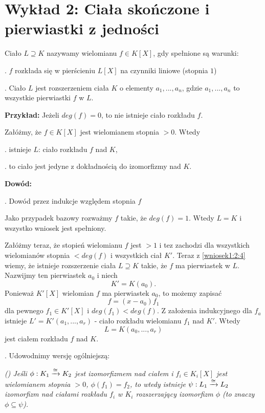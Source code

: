 \section{Wykład 2: Ciała skończone i pierwiastki z jedności}

\begin{important}
Ciało $L\supseteq K$ nazywamy  wielomianu $f\in K[X]$, gdy spełnione są warunki:

. $f$ rozkłada się w pierścieniu $L[X]$ na czynniki liniowe (stopnia $1$)

. Ciało $L$ jest rozszerzeniem ciała $K$ o elementy $a_1,...,a_n$, gdzie $a_1,...,a_n$ to wszystkie pierwiastki $f$ w $L$.
\end{important}

\textbf{Przykład:} Jeżeli $deg(f)=0$, to nie istnieje ciało rozkładu $f$.

\begin{wniosek}
    \label{wniosek:2.1}
    Załóżmy, że $f\in K[X]$ jest wielomianem stopnia $>0$. Wtedy

. istnieje $L$: ciało rozkładu $f$ nad $K$,

. to ciało jest jedyne z dokładnością do izomorfizmy nad $K$.
\end{wniosek}

\textbf{Dowód:}

. Dowód przez indukcje względem stopnia $f$

Jako przypadek bazowy rozważmy $f$ takie, że $deg(f)=1$. Wtedy $L=K$ i wszystko wniosek jest spełniony.

Załóżmy teraz, że stopień wielomianu $f$ jest $>1$ i tez zachodzi dla wszystkich wielomianów stopnia $<deg(f)$ i wszystkich ciał $K'$. Teraz z \ref{wniosek1:2:4} wiemy, że istnieje rozszerzenie ciała $L\supseteq K$ takie, że $f$ ma pierwiastek w $L$. Nazwijmy ten pierwiastek $a_0$ i niech
$$K'=K(a_0).$$
Ponieważ $K'[X]$ wielomian $f$ ma pierwiastek $a_0$, to możemy zapisać
$$f=(x-a_0)f_1$$
dla pewnego $f_1\in K'[X]$ i $deg(f_1)<deg(f)$. Z założenia indukcyjnego dla $f_a$ istnieje $L'=K'(a_1,...,a_r)$ - ciało rozkładu wielomianu $f_1$ nad $K'$. Wtedy 
$$L=K(a_0,...,a_r)$$
jest ciałem rozkładu $f$ nad $K$.

. Udowodnimy wersję ogólniejszą: 
\label{stwierdzenie:wniosek}

\emph{(\bat) Jeśli $\phi:K_1\xrightarrow[]{\cong} K_2$ jest izomorfizmem nad ciałem i $f_i\in K_i[X]$ jest wielomianem stopnia $>0$, $\phi(f_1)=f_2$, to wtedy istnieje $ \psi:L_1\xrightarrow[]{\cong} L_2$ izomorfizm nad ciałami rozkładu $f_i$ w $K_i$ rozszerzający izomorfizm $\phi$ (to znaczy $\phi\subseteq \psi$).}

